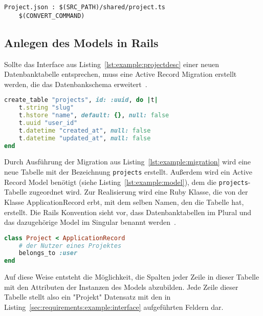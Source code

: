 \begin{lstlisting}[float=h!,caption={TypeScript Interface für die Project Darstellung in einer Liste}, label={lst:example:makefile}]
Project.json : $(SRC_PATH)/shared/project.ts
	$(CONVERT_COMMAND)
\end{lstlisting}

\subsection{Anlegen des Models in Rails}
\label{sec:requirements:example:model}

Sollte das Interface aus Listing~\ref{lst:example:projectdesc} einer neuen Datenbanktabelle entsprechen, muss eine Active Record Migration erstellt werden,
die das Datenbankschema erweitert~\cite{rails-migration}.

\begin{lstlisting}[language=Ruby,float=h!,caption={Rails Migration zum hinzufügen einer \texttt{projects} Datenbanktabelle}, label={lst:example:migration}]
create_table "projects", id: :uuid, do |t|
	t.string "slug"
	t.hstore "name", default: {}, null: false
	t.uuid "user_id"
	t.datetime "created_at", null: false
	t.datetime "updated_at", null: false
end
\end{lstlisting}

Durch Ausführung der Migration aus Listing~\ref{lst:example:migration} wird eine neue Tabelle mit der Bezeichnung \texttt{projects} erstellt.
Außerdem wird ein Active Record Model benötigt (siehe Listing~\ref{lst:example:model}), dem die \texttt{projects}-Tabelle zugeordnet wird.
Zur Realisierung wird eine Ruby Klasse, die
von der Klasse ApplicationRecord erbt, mit dem selben Namen, den die Tabelle hat, erstellt.
Die Rails Konvention sieht vor, dass Datenbanktabellen im Plural und das dazugehörige Model im Singular benannt werden~\cite{rails-naming-convention}.

\begin{lstlisting}[language=Ruby,float=h!,caption={Model}, label={lst:example:model}]
class Project < ApplicationRecord
	# der Nutzer eines Projektes
	belongs_to :user
end
\end{lstlisting}

Auf diese Weise entsteht die Möglichkeit, die Spalten jeder Zeile in dieser Tabelle mit den Attributen der Instanzen des Models abzubilden.
Jede Zeile dieser Tabelle stellt also ein "Projekt" Datensatz mit den in Listing~\ref{sec:requirements:example:interface} aufgeführten Feldern dar.

